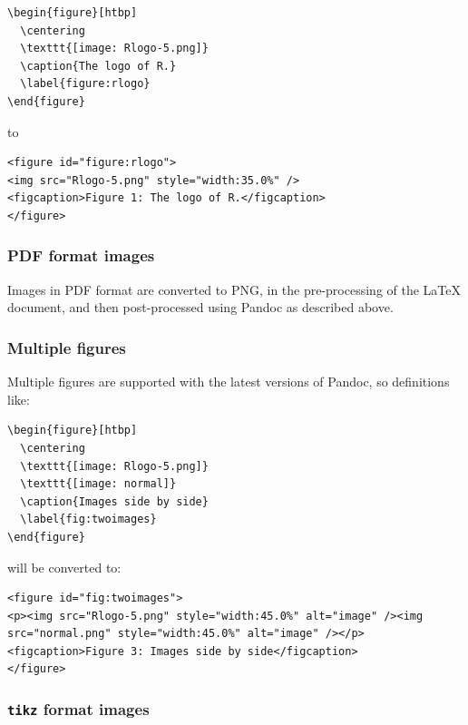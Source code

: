 \begin{verbatim}
\begin{figure}[htbp]
  \centering
  \texttt{[image: Rlogo-5.png]}
  \caption{The logo of R.}
  \label{figure:rlogo}
\end{figure}
\end{verbatim}

to

\begin{verbatim}
<figure id="figure:rlogo">
<img src="Rlogo-5.png" style="width:35.0%" />
<figcaption>Figure 1: The logo of R.</figcaption>
</figure>
\end{verbatim}

\hypertarget{pdf-format-images}{%
\subsubsection{PDF format images}\label{pdf-format-images}}

Images in PDF format are converted to PNG, in the pre-processing of the LaTeX document, and then post-processed using Pandoc as described above.

\hypertarget{multiple-figures}{%
\subsubsection{Multiple figures}\label{multiple-figures}}

Multiple figures are supported with the latest versions of Pandoc, so definitions like:

\begin{verbatim}
\begin{figure}[htbp]
  \centering
  \texttt{[image: Rlogo-5.png]}
  \texttt{[image: normal]}
  \caption{Images side by side}
  \label{fig:twoimages}
\end{figure}
\end{verbatim}

will be converted to:

\begin{verbatim}
<figure id="fig:twoimages">
<p><img src="Rlogo-5.png" style="width:45.0%" alt="image" /><img
src="normal.png" style="width:45.0%" alt="image" /></p>
<figcaption>Figure 3: Images side by side</figcaption>
</figure>
\end{verbatim}

\hypertarget{tikz-format-images}{%
\subsubsection{\texorpdfstring{\texttt{tikz} format images}{tikz format images}}\label{tikz-format-images}}

